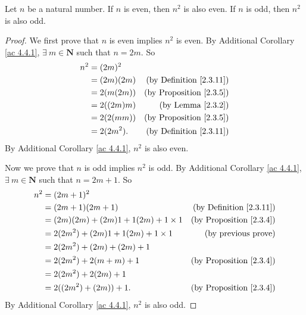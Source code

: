 \begin{additional corollary}\label{ac 4.4.2}
Let \(n\) be a natural number.
If \(n\) is even, then \(n^2\) is also even.
If \(n\) is odd, then \(n^2\) is also odd.
\end{additional corollary}

\begin{proof}
    We first prove that \(n\) is even implies \(n^2\) is even.
    By Additional Corollary \ref{ac 4.4.1}, \(\exists\ m \in \mathbf{N}\) such that \(n = 2m\).
    So
    \begin{align*}
        n^2 & = (2m)^2                                         \\
            & = (2m)(2m) & \text{(by Definition \ref{2.3.11})} \\
            & = 2(m(2m)) & \text{(by Proposition \ref{2.3.5})} \\
            & = 2((2m)m) & \text{(by Lemma \ref{2.3.2})}       \\
            & = 2(2(mm)) & \text{(by Proposition \ref{2.3.5})} \\
            & = 2(2m^2). & \text{(by Definition \ref{2.3.11})}
    \end{align*}
    By Additional Corollary \ref{ac 4.4.1}, \(n^2\) is also even.

    Now we prove that \(n\) is odd implies \(n^2\) is odd.
    By Additional Corollary \ref{ac 4.4.1}, \(\exists\ m \in \mathbf{N}\) such that \(n = 2m + 1\).
    So
    \begin{align*}
        n^2 & = (2m + 1)^2                                                                  \\
            & = (2m + 1)(2m + 1)                      & \text{(by Definition \ref{2.3.11})} \\
            & = (2m)(2m) + (2m)1 + 1(2m) + 1 \times 1 & \text{(by Proposition \ref{2.3.4})} \\
            & = 2(2m^2) + (2m)1 + 1(2m) + 1 \times 1  & \text{(by previous prove)}          \\
            & = 2(2m^2) + (2m) + (2m) + 1                                                   \\
            & = 2(2m^2) + 2(m + m) + 1                & \text{(by Proposition \ref{2.3.4})} \\
            & = 2(2m^2) + 2(2m) + 1                                                         \\
            & = 2((2m^2) + (2m)) + 1.                 & \text{(by Proposition \ref{2.3.4})} \\
    \end{align*}
    By Additional Corollary \ref{ac 4.4.1}, \(n^2\) is also odd.
\end{proof}

